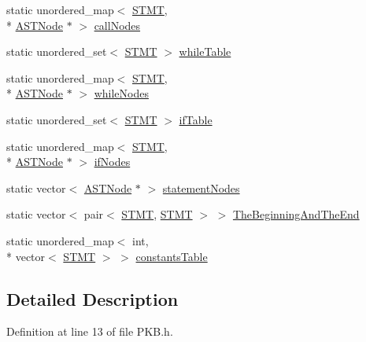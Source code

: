 \begin{DoxyCompactItemize}
\item 
static unordered\-\_\-map$<$ \hyperlink{std_afx_8h_a4a876b28ac3f59cecb39c2d2d76e4e7a}{S\-T\-M\-T}, \\*
\hyperlink{class_a_s_t_node}{A\-S\-T\-Node} $\ast$ $>$ \hyperlink{class_p_k_b_a54cdb3a6553fd54b689a812d3187ccce}{call\-Nodes}
\item 
static unordered\-\_\-set$<$ \hyperlink{std_afx_8h_a4a876b28ac3f59cecb39c2d2d76e4e7a}{S\-T\-M\-T} $>$ \hyperlink{class_p_k_b_ac2d6057e757e3f104e38866f8b6a16e9}{while\-Table}
\item 
static unordered\-\_\-map$<$ \hyperlink{std_afx_8h_a4a876b28ac3f59cecb39c2d2d76e4e7a}{S\-T\-M\-T}, \\*
\hyperlink{class_a_s_t_node}{A\-S\-T\-Node} $\ast$ $>$ \hyperlink{class_p_k_b_a4be6809486f222460f02b45261602dc7}{while\-Nodes}
\item 
static unordered\-\_\-set$<$ \hyperlink{std_afx_8h_a4a876b28ac3f59cecb39c2d2d76e4e7a}{S\-T\-M\-T} $>$ \hyperlink{class_p_k_b_a151454c4bd06a6a0df1905cb21634f13}{if\-Table}
\item 
static unordered\-\_\-map$<$ \hyperlink{std_afx_8h_a4a876b28ac3f59cecb39c2d2d76e4e7a}{S\-T\-M\-T}, \\*
\hyperlink{class_a_s_t_node}{A\-S\-T\-Node} $\ast$ $>$ \hyperlink{class_p_k_b_abc04a09157ed8733ea6ce207af0a837d}{if\-Nodes}
\item 
static vector$<$ \hyperlink{class_a_s_t_node}{A\-S\-T\-Node} $\ast$ $>$ \hyperlink{class_p_k_b_a04aa565187bc3a566ac0163027e46f46}{statement\-Nodes}
\item 
static vector$<$ pair$<$ \hyperlink{std_afx_8h_a4a876b28ac3f59cecb39c2d2d76e4e7a}{S\-T\-M\-T}, \hyperlink{std_afx_8h_a4a876b28ac3f59cecb39c2d2d76e4e7a}{S\-T\-M\-T} $>$ $>$ \hyperlink{class_p_k_b_a960218307dbb38c796142a0f392205b6}{The\-Beginning\-And\-The\-End}
\item 
static unordered\-\_\-map$<$ int, \\*
vector$<$ \hyperlink{std_afx_8h_a4a876b28ac3f59cecb39c2d2d76e4e7a}{S\-T\-M\-T} $>$ $>$ \hyperlink{class_p_k_b_a3354b7bf1c997e868b9273e5d19d673e}{constants\-Table}
\end{DoxyCompactItemize}


\subsection{Detailed Description}


Definition at line 13 of file P\-K\-B.\-h.



